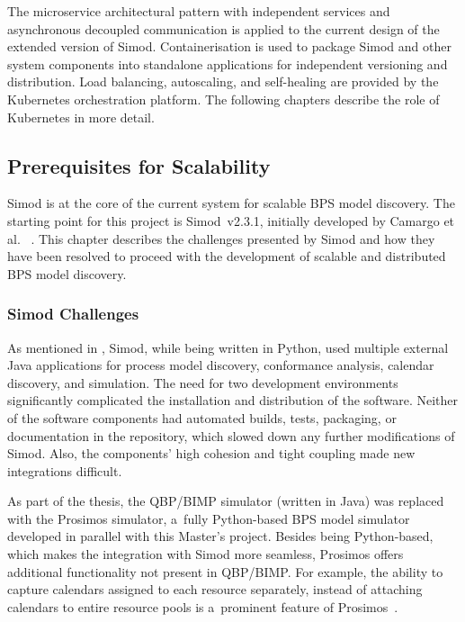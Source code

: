 \documentclass[12pt]{article}
\begin{document}
The microservice architectural pattern with independent services and asynchronous decoupled communication is applied to the current design of the extended version of Simod.
Containerisation is used to package Simod and other system components into standalone applications for independent versioning and distribution.
Load balancing, autoscaling, and self-healing are provided by the Kubernetes orchestration platform.
The following chapters describe the role of Kubernetes in more detail.

\subsection{Prerequisites for Scalability} \label{ch:prerequeisites_for_scalability}

Simod is at the core of the current system for scalable BPS model discovery. The starting point for this project is Simod~v2.3.1, initially developed by Camargo et al.~ \cite{camargo_automated_2020, camargo_simod_2021}. This chapter describes the challenges presented by Simod and how they have been resolved to proceed with the development of scalable and distributed BPS model discovery.

\subsubsection{Simod Challenges}

As mentioned in , Simod, while being written in Python, used multiple external Java applications for process model discovery, conformance analysis, calendar discovery, and simulation. 
The need for two development environments significantly complicated the installation and distribution of the software. 
Neither of the software components had automated builds, tests, packaging, or documentation in the repository, which slowed down any further modifications of Simod. 
Also, the components' high cohesion and tight coupling made new integrations difficult.

As part of the thesis, the QBP/BIMP simulator (written in Java) was replaced with the Prosimos simulator, a~fully Python-based BPS model simulator developed in parallel with this Master's project. 
Besides being Python-based, which makes the integration with Simod more seamless, Prosimos offers additional functionality not present in QBP/BIMP.
For example, the ability to capture calendars assigned to each resource separately, instead of attaching calendars to entire resource pools is a~prominent feature of Prosimos~\cite{lopez-pintado_prosimos_2023}.
\end{document}

